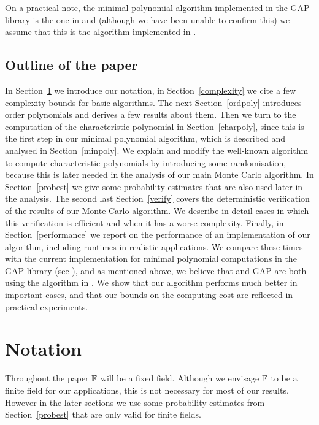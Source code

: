 On a practical note,  the minimal polynomial algorithm implemented in the GAP library
is the one in \cite{Steel} and (although we have been unable to 
confirm this) we assume that this is the algorithm implemented 
in {\MAGMA} \cite{Magma}. 

\subsection{Outline of the paper}
In Section~\ref{notation} we introduce our notation, in
Section~\ref{complexity} we cite a few complexity bounds for basic
algorithms. The next Section~\ref{ordpoly} introduces order polynomials
and derives a few results about them. Then we turn to the computation
of the characteristic polynomial in Section~\ref{charpoly}, since this
is the first step in our minimal polynomial algorithm, which is described
and analysed in Section~\ref{minpoly}. We explain and modify the 
well-known algorithm to compute characteristic polynomials by introducing
some randomisation, because this is later needed in the analysis of our
main Monte Carlo algorithm. In Section~\ref{probest} we give some
probability estimates that are also used later in the analysis.
The second last Section~\ref{verify}
covers the deterministic verification of the results of our
%
Monte Carlo algorithm. We describe in detail cases in which this
verification is efficient and when it has a worse complexity.
Finally, in Section~\ref{performance} we report on the performance
of an implementation of our algorithm, including runtimes in 
realistic applications.  We compare these
times with the current implementation for minimal polynomial computations
in the {\sf GAP} library (see \cite{GAP4}), and as mentioned above, we 
believe that {\MAGMA} and {\sf GAP} are both using the algorithm in 
\cite{Steel}. We show that our algorithm performs
much better in important cases, and that our bounds on the computing
cost are reflected in practical experiments.



\section{Notation}
\label{notation}

Throughout the paper $\mathbb{F}$ will be a fixed field. Although we envisage
$\mathbb{F}$ to be a finite field for our applications, this is not necessary
for most of our results. However in the later sections we use some probability 
estimates from Section~\ref{probest} that are only valid for 
finite fields.

